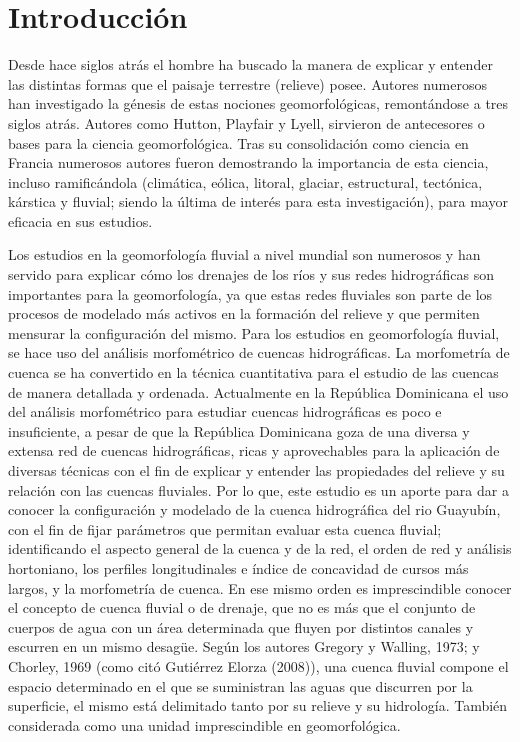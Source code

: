 \documentclass[11pt,]{article}
\begin{document}
\vskip 6.5pt


\noindent  \section{Introducción}\label{introducciuxf3n}

Desde hace siglos atrás el hombre ha buscado la manera de explicar y
entender las distintas formas que el paisaje terrestre (relieve) posee.
Autores numerosos han investigado la génesis de estas nociones
geomorfológicas, remontándose a tres siglos atrás. Autores como Hutton,
Playfair y Lyell, sirvieron de antecesores o bases para la ciencia
geomorfológica. Tras su consolidación como ciencia en Francia numerosos
autores fueron demostrando la importancia de esta ciencia, incluso
ramificándola (climática, eólica, litoral, glaciar, estructural,
tectónica, kárstica y fluvial; siendo la última de interés para esta
investigación), para mayor eficacia en sus estudios.

Los estudios en la geomorfología fluvial a nivel mundial son numerosos y
han servido para explicar cómo los drenajes de los ríos y sus redes
hidrográficas son importantes para la geomorfología, ya que estas redes
fluviales son parte de los procesos de modelado más activos en la
formación del relieve y que permiten mensurar la configuración del
mismo. Para los estudios en geomorfología fluvial, se hace uso del
análisis morfométrico de cuencas hidrográficas. La morfometría de cuenca
se ha convertido en la técnica cuantitativa para el estudio de las
cuencas de manera detallada y ordenada. Actualmente en la República
Dominicana el uso del análisis morfométrico para estudiar cuencas
hidrográficas es poco e insuficiente, a pesar de que la República
Dominicana goza de una diversa y extensa red de cuencas hidrográficas,
ricas y aprovechables para la aplicación de diversas técnicas con el fin
de explicar y entender las propiedades del relieve y su relación con las
cuencas fluviales. Por lo que, este estudio es un aporte para dar a
conocer la configuración y modelado de la cuenca hidrográfica del rio
Guayubín, con el fin de fijar parámetros que permitan evaluar esta
cuenca fluvial; identificando el aspecto general de la cuenca y de la
red, el orden de red y análisis hortoniano, los perfiles longitudinales
e índice de concavidad de cursos más largos, y la morfometría de cuenca.
En ese mismo orden es imprescindible conocer el concepto de cuenca
fluvial o de drenaje, que no es más que el conjunto de cuerpos de agua
con un área determinada que fluyen por distintos canales y escurren en
un mismo desagüe. Según los autores Gregory y Walling, 1973; y Chorley,
1969 (como citó Gutiérrez Elorza (2008)), una cuenca fluvial compone el
espacio determinado en el que se suministran las aguas que discurren por
la superficie, el mismo está delimitado tanto por su relieve y su
hidrología. También considerada como una unidad imprescindible en
geomorfológica.
\end{document}
